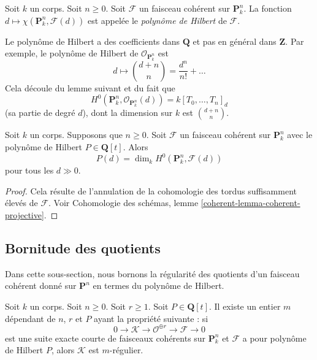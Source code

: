 \begin{definition}
\label{definition-hilbert-polynomial}
Soit $k$ un corps. Soit $n \geq 0$. Soit $\mathcal{F}$
un faisceau cohérent sur $\mathbf{P}^n_k$. La fonction
$d \mapsto \chi(\mathbf{P}^n_k, \mathcal{F}(d))$ est
appelée le {\it polynôme de Hilbert} de $\mathcal{F}$.
\end{definition}

\noindent
Le polynôme de Hilbert a des coefficients dans
$\mathbf{Q}$ et pas en général dans $\mathbf{Z}$. Par exemple,
le polynôme de Hilbert de $\mathcal{O}_{\mathbf{P}^n_k}$ est
$$
d \longmapsto {d + n \choose n} = \frac{d^n}{n!} + \ldots
$$
Cela découle du lemme suivant et du fait que
$$
H^0(\mathbf{P}^n_k, \mathcal{O}_{\mathbf{P}^n_k}(d)) = k[T_0, \ldots, T_n]_d
$$
(sa partie de degré $d$), dont la dimension sur $k$ est ${d + n \choose n}$.

\begin{lemma}
\label{lemma-hilbert-polynomial-H0}
Soit $k$ un corps. Supposons que $n \geq 0$.
Soit $\mathcal{F}$ un faisceau cohérent sur
$\mathbf{P}^n_k$ avec le polynôme de Hilbert $P \in \mathbf{Q}[t]$. Alors
$$
P(d) = \dim_k H^0(\mathbf{P}^n_k, \mathcal{F}(d))
$$
pour tous les $d \gg 0$.
\end{lemma}

\begin{proof}
Cela résulte de l'annulation de la cohomologie
des tordus suffisamment élevés de $\mathcal{F}$.
Voir Cohomologie des schémas,
lemme \ref{coherent-lemma-coherent-projective}.
\end{proof}



\subsection{Bornitude des quotients}
\label{subsection-boundedness}

\noindent
Dans cette sous-section, nous bornons la
régularité des quotients d'un faisceau cohérent donné
sur $\mathbf{P}^n$ en termes du polynôme de Hilbert.

\begin{lemma}
\label{lemma-bound-quotients-free}
Soit $k$ un corps. Soit $n \geq 0$. Soit $r
\geq 1$. Soit $P \in \mathbf{Q}[t]$. Il existe un entier $m$
dépendant de $n$, $r$ et $P$ ayant la propriété suivante : si
$$
0 \to \mathcal{K} \to \mathcal{O}^{\oplus r} \to \mathcal{F} \to 0
$$
est une suite exacte courte de faisceaux cohérents
sur $\mathbf{P}^n_k$ et $\mathcal{F}$ a pour polynôme
de Hilbert $P$, alors $\mathcal{K}$ est $m$-régulier.
\end{lemma}

